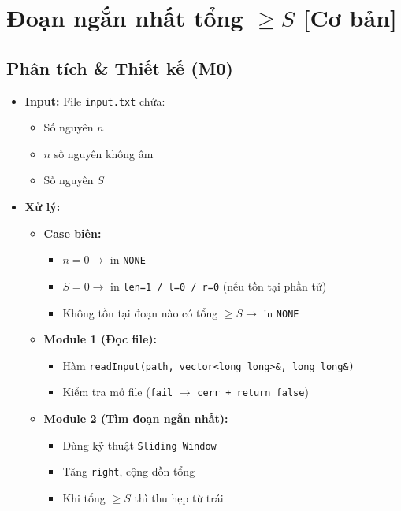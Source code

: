 \section{Đoạn ngắn nhất tổng $\geq S$ [Cơ bản]}
\subsection{Phân tích \& Thiết kế (M0)}
\begin{itemize}
    \item \textbf{Input:}
    File \texttt{input.txt} chứa:
    \begin{itemize}
        \item Số nguyên $n$
        \item $n$ số nguyên không âm
        \item Số nguyên $S$
    \end{itemize}

    \item \textbf{Xử lý:}
    \begin{itemize}
        \item \textbf{Case biên:}
        \begin{itemize}
            \item $n = 0 \rightarrow$ in \texttt{NONE}
            \item $S = 0 \rightarrow$ in \texttt{len=1 / l=0 / r=0} (nếu tồn tại phần tử)
            \item Không tồn tại đoạn nào có tổng $\geq S \rightarrow$ in \texttt{NONE}
        \end{itemize}

        \item \textbf{Module 1 (Đọc file):}
        \begin{itemize}
            \item Hàm \texttt{readInput(path, vector<long long>\&, long long\&)}
            \item Kiểm tra mở file (\texttt{fail} $\rightarrow$ \texttt{cerr + return false})
        \end{itemize}

        \item \textbf{Module 2 (Tìm đoạn ngắn nhất):}
        \begin{itemize}
            \item Dùng kỹ thuật \texttt{Sliding Window}
            \item Tăng \texttt{right}, cộng dồn tổng
            \item Khi tổng $\geq S$ thì thu hẹp từ trái
        \end{itemize}


\end{itemize}
\end{itemize}
